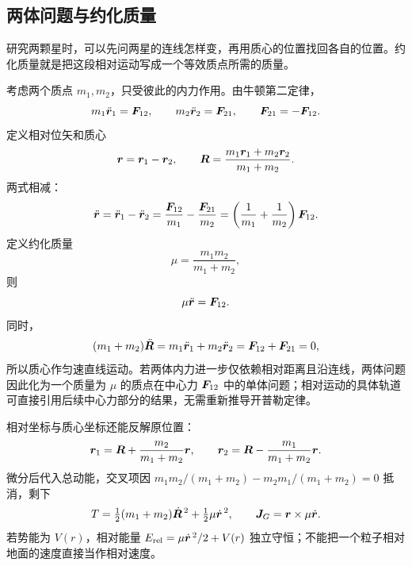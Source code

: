 \subsection{两体问题与约化质量}

研究两颗星时，可以先问两星的连线怎样变，再用质心的位置找回各自的位置。约化质量就是把这段相对运动写成一个等效质点所需的质量。

考虑两个质点 $m_1,m_2$，只受彼此的内力作用。由牛顿第二定律，
\begin{equation}
m_1\ddot{\boldsymbol{r}}_1=\boldsymbol{F}_{12},\qquad
m_2\ddot{\boldsymbol{r}}_2=\boldsymbol{F}_{21},\qquad
\boldsymbol{F}_{21}=-\boldsymbol{F}_{12}.
\end{equation}
定义相对位矢和质心
\begin{equation}
\boldsymbol{r}=\boldsymbol{r}_1-\boldsymbol{r}_2,\qquad
\boldsymbol{R}=\frac{m_1\boldsymbol{r}_1+m_2\boldsymbol{r}_2}{m_1+m_2}.
\end{equation}
两式相减：
\begin{equation}
\ddot{\boldsymbol{r}}=\ddot{\boldsymbol{r}}_1-\ddot{\boldsymbol{r}}_2
=\frac{\boldsymbol{F}_{12}}{m_1}-\frac{\boldsymbol{F}_{21}}{m_2}
=\left(\frac1{m_1}+\frac1{m_2}\right)\boldsymbol{F}_{12}.
\end{equation}
定义约化质量
\begin{equation}
\mu=\frac{m_1m_2}{m_1+m_2},
\end{equation}
则
\begin{equation}
\mu\ddot{\boldsymbol{r}}=\boldsymbol{F}_{12}.
\label{eq:reduced-ch1}
\end{equation}
同时，
\begin{equation}
(m_1+m_2)\ddot{\boldsymbol{R}}
=m_1\ddot{\boldsymbol{r}}_1+m_2\ddot{\boldsymbol{r}}_2
=\boldsymbol{F}_{12}+\boldsymbol{F}_{21}=0,
\end{equation}
所以质心作匀速直线运动。若两体内力进一步仅依赖相对距离且沿连线，两体问题因此化为一个质量为 \(\mu\) 的质点在中心力 \(\boldsymbol{F}_{12}\) 中的单体问题；相对运动的具体轨道可直接引用后续中心力部分的结果，无需重新推导开普勒定律。

相对坐标与质心坐标还能反解原位置：
\[
\boldsymbol{r}_1=\boldsymbol{R}+\frac{m_2}{m_1+m_2}\boldsymbol{r},\qquad
\boldsymbol{r}_2=\boldsymbol{R}-\frac{m_1}{m_1+m_2}\boldsymbol{r}.
\]
微分后代入总动能，交叉项因 $m_1m_2/(m_1+m_2)-m_2m_1/(m_1+m_2)=0$ 抵消，剩下
\begin{equation}\label{eq:ch1-twobody-energy}
T=\tfrac12(m_1+m_2)\dot{\boldsymbol{R}}^{\,2}+\tfrac12\mu\dot{\boldsymbol{r}}^{\,2},\qquad
\boldsymbol{J}_G=\boldsymbol{r}\times\mu\dot{\boldsymbol{r}}.
\end{equation}
若势能为 $V(r)$，相对能量 $E_{\rm rel}=\mu\dot{\boldsymbol{r}}^{\,2}/2+V(r)$ 独立守恒；不能把一个粒子相对地面的速度直接当作相对速度。

